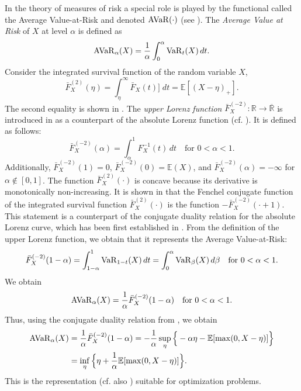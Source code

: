 \documentclass[10pt,letterpaper]{article}
\newcommand{\R}{\mathbb{R}}
\newcommand{\1}{1{\hskip -2.55 pt}\hbox{I}}
\begin{document}
In the theory of measures of risk a special role is played by the functional called the Average Value-at-Risk and denoted ${\rm AVaR}(\cdot)$ (see \cite{acerbi2002coherence,ogryczak2002dual,rockafellar2002conditional}). The \emph{Average Value at Risk} of $X$ at level $\alpha$ is defined as
\begin{equation}
\label{eq:AVAR}
{\rm AVaR}_{\alpha}(X) = \frac{1}{\alpha} \int_0^{\alpha} {\rm VaR}_t(X)\, dt.
\end{equation}
Consider the integrated survival function of the random variable $X$,
\[
\bar{F}^{(2)}_X(\eta) = \int_\eta^\infty \bar{F}_X(t)\big]\; dt=\mathbb{E}[(X-\eta)_+].
\]
The second equality is shown in \cite{ddgmtwo}. 
The \emph{upper Lorenz function} $\bar{F}^{(-2)}_X:\R\to\overline{\R}$ is introduced in \cite{ddgmtwo} as a counterpart of the absolute Lorenz function 
(cf. \cite{Lorenz:1905,arnold1987lorenz,gastwirth1972estimation}). It is defined as follows:
\begin{equation}
\label{ulf}
\bar{F}^{(-2)}_X(\alpha)= \int_{\alpha}^1F_X^{-1}(t)\,dt\quad \text{for } 0< \alpha < 1.
\end{equation}
Additionally, $\bar{F}^{(-2)}_X(1)=0$, $\bar{F}^{(-2)}_X(0)=\mathbb{E}(X)$, and $\bar{F}_X^{(-2)}(\alpha)= -\infty$  for $\alpha\not\in[0,1]$.
The function $\bar{F}^{(2)}_X(\cdot)$ is concave because its derivative is monotonically non-increasing.
It is shown in \cite{ddgmtwo} that the Fenchel conjugate function of  the integrated survival function $\bar{F}^{(2)}_X(\cdot)$ is the function
$-\bar{F}^{(-2)}_X(\cdot+1)$. 
This statement is a counterpart of the conjugate duality relation for the absolute Lorenz curve, which has been first established in
 \cite[Theorem 3.1]{OgRu:2002}.
From the definition of the upper Lorenz function, we obtain that it represents the Average Value-at-Risk: 
 \begin{equation}
\label{ulf-cont}
\bar{F}^{(-2)}_X(1-\alpha)= \int_{1-\alpha}^1{\rm VaR}_{1-t}(X)\,dt = \int_0^{\alpha}{\rm VaR}_{\beta}(X)\,d\beta\quad \text{for } 0< \alpha < 1.
\end{equation}
We obtain
\[
{\rm AVaR}_\alpha(X)= \frac{1}{\alpha} \bar{F}^{(-2)}_X(1-\alpha) \quad \text{for } 0< \alpha < 1.
\]
Thus, using the conjugate duality relation from  \cite{ddgmtwo}, we obtain 
\begin{align*}
{\rm AVaR}_\alpha(X) & = \frac{1}{\alpha} \bar{F}^{(-2)}_X(1-\alpha)
 = -\frac{1}{\alpha} \sup_\eta\Big\{ -\alpha\eta- \mathbb{E}[\max(0,X-\eta)]\Big\}\\
& =\inf_\eta\Big\{ \eta + \frac{1}{\alpha} \mathbb{E}[\max(0,X-\eta)]\Big\}.
\end{align*}
This is the representation (cf. also \cite{shapiro2014lectures}) suitable for optimization problems. 
\end{document}
